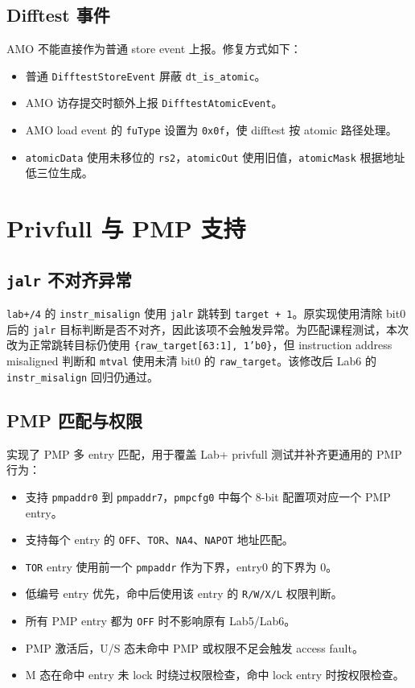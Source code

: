 \documentclass[UTF8,a4paper,11pt]{ctexart}
\begin{document}
\subsection{Difftest 事件}

AMO 不能直接作为普通 store event 上报。修复方式如下：

\begin{itemize}
  \item 普通 \texttt{DifftestStoreEvent} 屏蔽 \texttt{dt\_is\_atomic}。
  \item AMO 访存提交时额外上报 \texttt{DifftestAtomicEvent}。
  \item AMO load event 的 \texttt{fuType} 设置为 \texttt{0x0f}，使 difftest 按 atomic 路径处理。
  \item \texttt{atomicData} 使用未移位的 \texttt{rs2}，\texttt{atomicOut} 使用旧值，\texttt{atomicMask} 根据地址低三位生成。
\end{itemize}

\section{Privfull 与 PMP 支持}

\subsection{\texttt{jalr} 不对齐异常}

\texttt{lab+/4} 的 \texttt{instr\_misalign} 使用 \texttt{jalr} 跳转到 \texttt{target + 1}。原实现使用清除 bit0 后的 \texttt{jalr} 目标判断是否不对齐，因此该项不会触发异常。为匹配课程测试，本次改为正常跳转目标仍使用 \texttt{\{raw\_target[63:1], 1'b0\}}，但 instruction address misaligned 判断和 \texttt{mtval} 使用未清 bit0 的 \texttt{raw\_target}。该修改后 Lab6 的 \texttt{instr\_misalign} 回归仍通过。

\subsection{PMP 匹配与权限}

实现了 PMP 多 entry 匹配，用于覆盖 Lab+ privfull 测试并补齐更通用的 PMP 行为：

\begin{itemize}
  \item 支持 \texttt{pmpaddr0} 到 \texttt{pmpaddr7}，\texttt{pmpcfg0} 中每个 8-bit 配置项对应一个 PMP entry。
  \item 支持每个 entry 的 \texttt{OFF}、\texttt{TOR}、\texttt{NA4}、\texttt{NAPOT} 地址匹配。
  \item \texttt{TOR} entry 使用前一个 \texttt{pmpaddr} 作为下界，entry0 的下界为 0。
  \item 低编号 entry 优先，命中后使用该 entry 的 \texttt{R/W/X/L} 权限判断。
  \item 所有 PMP entry 都为 \texttt{OFF} 时不影响原有 Lab5/Lab6。
  \item PMP 激活后，U/S 态未命中 PMP 或权限不足会触发 access fault。
  \item M 态在命中 entry 未 lock 时绕过权限检查，命中 lock entry 时按权限检查。
\end{itemize}
\end{document}
